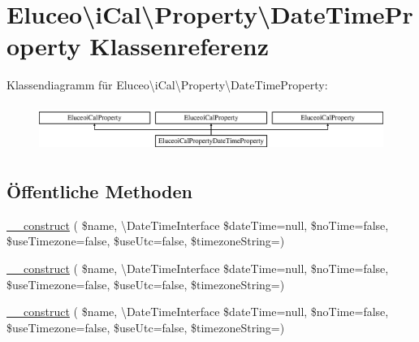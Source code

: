 \hypertarget{class_eluceo_1_1i_cal_1_1_property_1_1_date_time_property}{}\section{Eluceo\textbackslash{}i\+Cal\textbackslash{}Property\textbackslash{}Date\+Time\+Property Klassenreferenz}
\label{class_eluceo_1_1i_cal_1_1_property_1_1_date_time_property}
Klassendiagramm für Eluceo\textbackslash{}i\+Cal\textbackslash{}Property\textbackslash{}Date\+Time\+Property\+:\begin{figure}[H]
\begin{center}
\leavevmode
\includegraphics[height=1.536351cm]{class_eluceo_1_1i_cal_1_1_property_1_1_date_time_property}
\end{center}
\end{figure}
\subsection*{Öffentliche Methoden}
\begin{DoxyCompactItemize}
\item 
\mbox{\hyperlink{class_eluceo_1_1i_cal_1_1_property_1_1_date_time_property_af27c61bb01dbb446ba7ff2b38132c5a1}{\+\_\+\+\_\+construct}} ( \$name, \textbackslash{}Date\+Time\+Interface \$date\+Time=null, \$no\+Time=false, \$use\+Timezone=false, \$use\+Utc=false, \$timezone\+String=\textquotesingle{}\textquotesingle{})
\item 
\mbox{\hyperlink{class_eluceo_1_1i_cal_1_1_property_1_1_date_time_property_af27c61bb01dbb446ba7ff2b38132c5a1}{\+\_\+\+\_\+construct}} ( \$name, \textbackslash{}Date\+Time\+Interface \$date\+Time=null, \$no\+Time=false, \$use\+Timezone=false, \$use\+Utc=false, \$timezone\+String=\textquotesingle{}\textquotesingle{})
\item 
\mbox{\hyperlink{class_eluceo_1_1i_cal_1_1_property_1_1_date_time_property_af27c61bb01dbb446ba7ff2b38132c5a1}{\+\_\+\+\_\+construct}} ( \$name, \textbackslash{}Date\+Time\+Interface \$date\+Time=null, \$no\+Time=false, \$use\+Timezone=false, \$use\+Utc=false, \$timezone\+String=\textquotesingle{}\textquotesingle{})
\end{DoxyCompactItemize}
